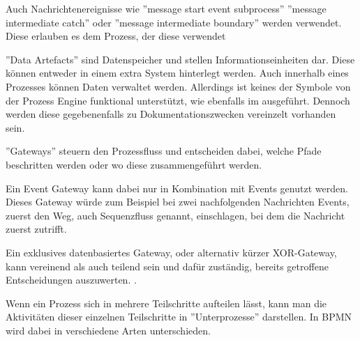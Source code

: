 



Auch Nachrichtenereignisse wie ''message start event subprocess'' ''message intermediate catch'' oder ''message intermediate boundary'' werden verwendet. Diese erlauben es dem Prozess, der diese verwendet \citep[vgl.][S. 102]{bruce}

''Data Artefacts'' sind Datenspeicher und stellen Informationseinheiten dar. Diese können entweder in einem extra System hinterlegt werden. Auch innerhalb eines Prozesses können Daten verwaltet werden. Allerdings ist keines der Symbole von der Prozess Engine funktional unterstützt, wie ebenfalls im  ausgeführt. Dennoch werden diese gegebenenfalls zu Dokumentationszwecken vereinzelt vorhanden sein. \citep[vgl.][S. 59]{bruce_bpmn_2012}




''Gateways'' steuern den Prozessfluss und entscheiden dabei, welche Pfade beschritten werden oder wo diese zusammengeführt werden.

Ein Event Gateway kann dabei nur in Kombination mit Events genutzt werden. Dieses Gateway würde zum Beispiel bei zwei nachfolgenden Nachrichten Events, zuerst den Weg, auch Sequenzfluss genannt, einschlagen, bei dem die Nachricht zuerst zutrifft. \citep[vgl.][S. 46]{bruce_bpmn_2012}

Ein exklusives datenbasiertes Gateway, oder alternativ kürzer XOR-Gateway, kann vereinend als auch teilend sein und dafür zuständig, bereits getroffene Entscheidungen auszuwerten. \citep[vgl.][S. 125f]{bruce_englisch_2011}. 

\clearpage
{}
Wenn ein Prozess sich in mehrere Teilschritte aufteilen lässt, kann man die Aktivitäten dieser einzelnen Teilschritte in ''Unterprozesse'' darstellen. In BPMN wird dabei in verschiedene Arten unterschieden. \citep[vgl.][S. 41]{bruce_bpmn_2012}

